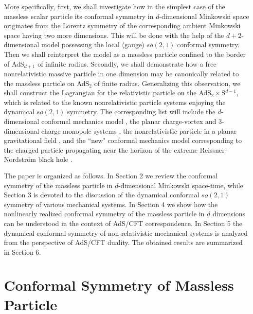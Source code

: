 \documentclass[a4paper,12pt]{article}
\begin{document}
More specifically,
first, we shall investigate how
in the simplest case of the massless scalar particle
its conformal symmetry
in $d$-dimensional Minkowski space
originates from the Lorentz symmetry
of the corresponding ambient Minkowski space
having two more dimensions.
This will be done with the help of
the $d+2$-dimensional model
possessing the local (gauge) $so(2,1)$ conformal symmetry.
Then we shall reinterpret the model
as a massless particle
confined to the border of AdS${}_{d+1}$
of infinite radius.
Secondly, we shall demonstrate how a free nonrelativistic
massive particle in one dimension may be canonically related
to the massless particle on AdS${}_{2}$
of finite radius.
Generalizing this observation,
we shall construct
the Lagrangian for the
relativistic particle on the
AdS${}_{2}\times$S${}^{d-1}$,
which is related to the known
nonrelativistic particle systems
enjoying the dynamical $so(2,1)$ symmetry.
The corresponding list
will include the $d$-dimensional conformal mechanics model
\cite{AFF}, the planar charge-vortex and $3$-dimensional
charge-monopole systems \cite{Jackm,Jackv},
the nonrelativistic particle in a planar
gravitational field \cite{Des},
and the
``new" conformal
mechanics model corresponding to the charged
particle propagating near the horizon of the
extreme Reissner-Nordstr\"om
black hole \cite{kallosh}.

The paper is organized as follows.
In Section 2 we review the conformal symmetry
of the massless particle in $d$-dimensional Minkowski
space-time, while Section 3 is devoted
to the discussion of the dynamical
conformal $so(2,1)$
symmetry of various mechanical
systems.  In Section 4 we show how
the nonlinearly realized conformal symmetry of the massless
particle in $d$ dimensions can be understood
in the context of AdS/CFT correspondence.
In Section 5 the dynamical
conformal symmetry of non-relativistic
mechanical systems is analyzed from the perspective
of AdS/CFT duality.
The obtained results are summarized in Section 6.



\section{\protect\bigskip Conformal Symmetry of Massless
Particle}
\end{document}
